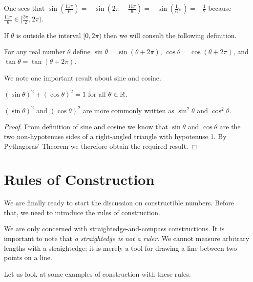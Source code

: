 
\begin{example}
    One sees that $\sin(\frac{11\pi}{6}) = -\sin(2\pi-\frac{11\pi}{6}) = -\sin(\frac16\pi) = -\frac12$ because $\frac{11\pi}{6} \in [\frac{3\pi}2, 2\pi)$.
\end{example}

If $\theta$ is outside the interval $[0, 2\pi)$ then we will consult the following definition.

\begin{definition}
    For any real number $\theta$ define $\sin\theta = \sin(\theta + 2\pi)$, $\cos\theta = \cos(\theta + 2\pi)$, and $\tan\theta = \tan(\theta + 2\pi)$.
\end{definition}

We note one important result about sine and cosine.
\begin{theorem}
    $(\sin\theta)^2 + (\cos\theta)^2 = 1$ for all $\theta \in \mathbb{R}$.
\end{theorem}
\begin{remark}
    $(\sin\theta)^2$ and $(\cos\theta)^2$ are more commonly written as $\sin^2\theta$ and $\cos^2\theta$.
\end{remark}
\begin{proof}
    From definition of sine and cosine we know that $\sin\theta$ and $\cos\theta$ are the two non-hypotenuse sides of a right-angled triangle with hypotenuse 1. By Pythagoras' Theorem we therefore obtain the required result.
\end{proof}

\section{Rules of Construction}
We are finally ready to start the discussion on constructible numbers. Before that, we need to introduce the rules of construction.

We are only concerned with straightedge-and-compass constructions. It is important to note that \textit{a straightedge is not a ruler}. We cannot measure arbitrary lengths with a straightedge; it is merely a tool for drawing a line between two points on a line.

Let us look at some examples of construction with these rules.

